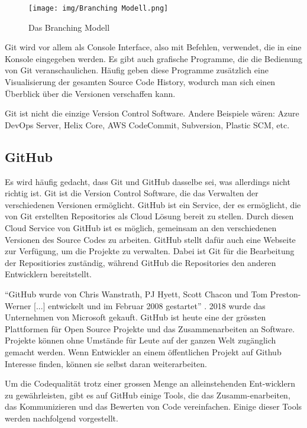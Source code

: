 \begin{figure}[htp]
    \centering
    \texttt{[image: img/Branching Modell.png]}
    \caption{Das Branching Modell \cite{noauthor_successful_nodate}}
    \label{fig:branch}
\end{figure}

Git wird vor allem als Console Interface, also mit Befehlen, verwendet, die in
eine Konsole eingegeben werden. Es gibt auch grafische Programme, die die
Bedienung von Git veranschaulichen. Häufig geben diese Programme
zusätzlich eine Visualisierung der gesamten Source Code History, wodurch man
sich einen Überblick über die Versionen verschaffen kann. 

Git ist nicht die einzige Version Control Software. Andere Beispiele wären:
Azure DevOps Server, Helix Core, AWS CodeCommit, Subversion, Plastic SCM, etc. 
\cite{noauthor_git_nodate-1}

\subsection*{GitHub}
Es wird häufig gedacht, dass Git und GitHub dasselbe sei, was allerdings nicht
richtig ist. Git ist die Version Control Software, die das Verwalten der
verschiedenen Versionen ermöglicht. GitHub ist ein Service, der es ermöglicht,
die von Git erstellten Repositories als Cloud Lösung bereit zu stellen. Durch
diesen Cloud Service von GitHub ist es möglich, gemeinsam an den verschiedenen
Versionen des Source Codes zu arbeiten. GitHub stellt dafür auch eine Webseite
zur Verfügung, um die Projekte zu verwalten. Dabei ist Git für die Bearbeitung
der Repositiories zuständig, während GitHub die Repositories den anderen
Entwicklern bereitstellt.
\cite{noauthor_github_2021} 

``GitHub wurde von Chris Wanstrath, PJ Hyett, Scott Chacon und Tom Preston-Werner
[...] entwickelt und im Februar 2008 gestartet'' \cite{noauthor_github_2021}.
2018 wurde das Unternehmen von Microsoft gekauft. GitHub ist heute eine der
grössten Plattformen für Open Source Projekte und das Zusammenarbeiten an
Software. Projekte können ohne Umstände für Leute auf der ganzen Welt zugänglich
gemacht werden. Wenn Entwickler an einem öffentlichen Projekt auf Github
Interesse finden, können sie selbst daran weiterarbeiten. 
\cite{noauthor_github_2021}

Um die Codequalität trotz einer grossen Menge an alleinstehenden Ent\hyp{}wicklern zu
gewährleisten, gibt es auf GitHub einige Tools, die das Zusamm\hyp{}enarbeiten, das
Kommunizieren und das Bewerten von Code vereinfachen. Einige dieser Tools werden
nachfolgend vorgestellt.

